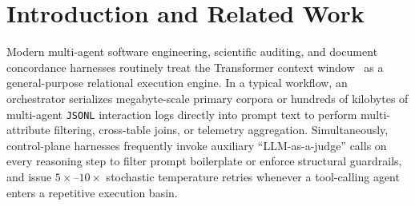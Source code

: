 \documentclass[11pt]{article}
\theoremstyle{plain}
\theoremstyle{definition}
\begin{document}
\section{Introduction and Related Work}\label{sec:intro}

Modern multi-agent software engineering, scientific auditing, and document concordance harnesses routinely treat the Transformer context window~\cite{vaswani2017attention} as a general-purpose relational execution engine. In a typical workflow, an orchestrator serializes megabyte-scale primary corpora or hundreds of kilobytes of multi-agent \texttt{JSONL} interaction logs directly into prompt text to perform multi-attribute filtering, cross-table joins, or telemetry aggregation. Simultaneously, control-plane harnesses frequently invoke auxiliary ``LLM-as-a-judge'' calls on every reasoning step to filter prompt boilerplate or enforce structural guardrails, and issue $5\times$--$10\times$ stochastic temperature retries whenever a tool-calling agent enters a repetitive execution basin.
\end{document}
